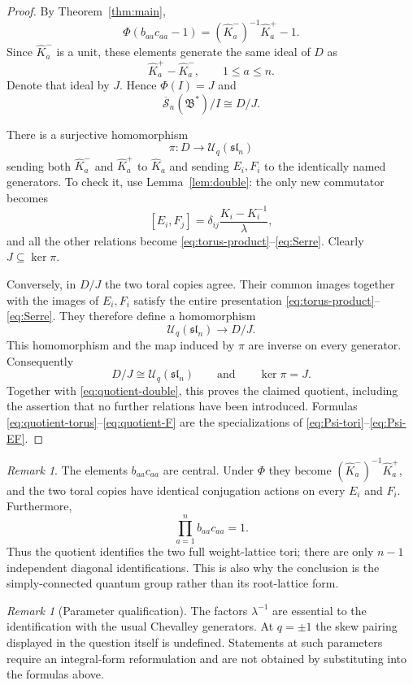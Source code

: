 \documentclass[11pt]{article}
\theoremstyle{remark}
\newtheorem{remark}[theorem]{Remark}
\newcommand{\UU}{\mathcal U_q}
\newcommand{\rSk}{\overline{\mathscr S}_n}
\newcommand{\Bstar}{\mathfrak B^{*}}
\newcommand{\slie}{\mathfrak{sl}_n}
\begin{document}
\begin{proof}
By Theorem~\ref{thm:main},
\[
 \Phi(b_{aa}c_{aa}-1)
   =(\widehat K_a^-)^{-1}\widehat K_a^+-1.
\]
Since $\widehat K_a^-$ is a unit, these elements generate the
same ideal of $D$ as
\[
 \widehat K_a^+-\widehat K_a^-,
 \qquad 1\leq a\leq n.
\]
Denote that ideal by $J$.  Hence $\Phi(I)=J$ and
\begin{equation}\label{eq:quotient-double}
 \rSk(\Bstar)/I\cong D/J.
\end{equation}

There is a surjective homomorphism
\[
 \pi:D\longrightarrow\UU(\slie)
\]
sending both $\widehat K_a^-$ and $\widehat K_a^+$ to
$\widehat K_a$ and sending $E_i,F_i$ to the identically named
generators.  To check it, use Lemma~\ref{lem:double}:
the only new commutator becomes
\[
 [E_i,F_j]
   =\delta_{ij}\frac{K_i-K_i^{-1}}{\lambda},
\]
and all the other relations become
\eqref{eq:torus-product}--\eqref{eq:Serre}.
Clearly $J\subseteq\ker\pi$.

Conversely, in $D/J$ the two toral copies agree.  Their common
images together with the images of $E_i,F_i$ satisfy the entire
presentation \eqref{eq:torus-product}--\eqref{eq:Serre}.  They
therefore define a homomorphism
\[
 \UU(\slie)\longrightarrow D/J.
\]
This homomorphism and the map induced by $\pi$ are inverse on
every generator.  Consequently
\[
 D/J\cong\UU(\slie)
 \qquad\text{and}\qquad \ker\pi=J.
\]
Together with \eqref{eq:quotient-double}, this proves the claimed
quotient, including the assertion that no further relations have
been introduced.  Formulas
\eqref{eq:quotient-torus}--\eqref{eq:quotient-F} are the
specializations of \eqref{eq:Psi-tori}--\eqref{eq:Psi-EF}.
\end{proof}

\begin{remark}
The elements $b_{aa}c_{aa}$ are central.  Under $\Phi$ they become
$(\widehat K_a^-)^{-1}\widehat K_a^+$, and the two toral copies
have identical conjugation actions on every $E_i$ and $F_i$.
Furthermore,
\[
 \prod_{a=1}^n b_{aa}c_{aa}=1.
\]
Thus the quotient identifies the two full weight-lattice tori;
there are only $n-1$ independent diagonal identifications.
This is also why the conclusion is the simply-connected quantum
group rather than its root-lattice form.
\end{remark}

\begin{remark}[Parameter qualification]
The factors $\lambda^{-1}$ are essential to the identification
with the usual Chevalley generators.  At $q=\pm1$ the skew pairing
displayed in the question itself is undefined.  Statements at
such parameters require an integral-form reformulation and are
not obtained by substituting into the formulas above.
\end{remark}
\end{document}
